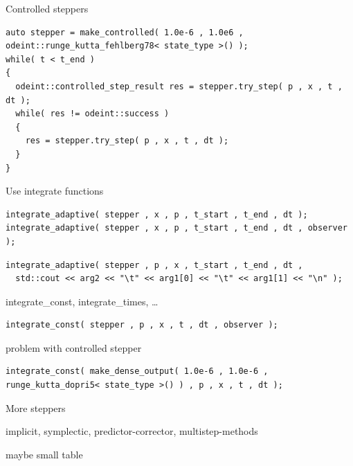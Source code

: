\begin{frame}[fragile]

Controlled steppers

\begin{lstlisting}
auto stepper = make_controlled( 1.0e-6 , 1.0e6 ,  odeint::runge_kutta_fehlberg78< state_type >() );
while( t < t_end )
{
  odeint::controlled_step_result res = stepper.try_step( p , x , t , dt );
  while( res != odeint::success )
  {
    res = stepper.try_step( p , x , t , dt );
  }
}
\end{lstlisting}

Use integrate functions

\begin{lstlisting}
integrate_adaptive( stepper , x , p , t_start , t_end , dt ); 
integrate_adaptive( stepper , x , p , t_start , t_end , dt , observer );
\end{lstlisting}

\begin{lstlisting}
integrate_adaptive( stepper , p , x , t_start , t_end , dt ,
  std::cout << arg2 << "\t" << arg1[0] << "\t" << arg1[1] << "\n" );
\end{lstlisting}

integrate\_const, integrate\_times, \dots

\end{frame}



\begin{frame}[fragile]

\begin{lstlisting}
integrate_const( stepper , p , x , t , dt , observer );
\end{lstlisting}

problem with controlled stepper

\begin{lstlisting}
integrate_const( make_dense_output( 1.0e-6 , 1.0e-6 , runge_kutta_dopri5< state_type >() ) , p , x , t , dt );
\end{lstlisting}


\end{frame}




\begin{frame}
 More steppers

 implicit, symplectic, predictor-corrector, multistep-methods

 maybe small table
\end{frame}




